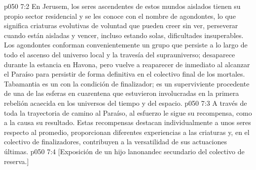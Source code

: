 \vs p050 7:2 En Jerusem, los seres ascendentes de estos mundos aislados tienen su propio sector residencial y se les conoce con el nombre de agondontes, lo que significa criaturas evolutivas de voluntad que pueden creer sin ver, perseverar cuando están aisladas y vencer, incluso estando solas, dificultades insuperables. Los agondontes conforman convenientemente un grupo que persiste a lo largo de todo el ascenso del universo local y la travesía del suprauniverso; desaparece durante la estancia en Havona, pero vuelve a reaparecer de inmediato al alcanzar el Paraíso para persistir de forma definitiva en el colectivo final de los mortales. Tabamantia es un  con la condición de finalizador; es un superviviente procedente de una de las esferas en cuarentena que estuvieron involucradas en la primera rebelión acaecida en los universos del tiempo y del espacio.
\vs p050 7:3 A través de toda la trayectoria de camino al Paraíso, al esfuerzo le sigue su recompensa, como a la causa su resultado. Estas recompensas destacan individualmente a unos seres respecto al promedio, proporcionan diferentes experiencias a las criaturas y, en el colectivo de finalizadores, contribuyen a la versatilidad de sus actuaciones últimas.
\vsetoff
\vs p050 7:4 [Exposición de un hijo lanonandec secundario del colectivo de reserva.]
